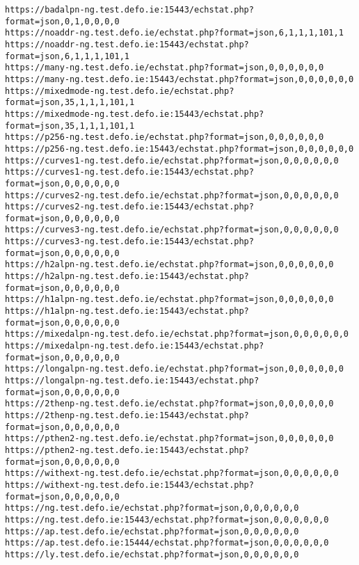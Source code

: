 \begin{verbatim}
https://badalpn-ng.test.defo.ie:15443/echstat.php?format=json,0,1,0,0,0,0
https://noaddr-ng.test.defo.ie/echstat.php?format=json,6,1,1,1,101,1
https://noaddr-ng.test.defo.ie:15443/echstat.php?format=json,6,1,1,1,101,1
https://many-ng.test.defo.ie/echstat.php?format=json,0,0,0,0,0,0
https://many-ng.test.defo.ie:15443/echstat.php?format=json,0,0,0,0,0,0
https://mixedmode-ng.test.defo.ie/echstat.php?format=json,35,1,1,1,101,1
https://mixedmode-ng.test.defo.ie:15443/echstat.php?format=json,35,1,1,1,101,1
https://p256-ng.test.defo.ie/echstat.php?format=json,0,0,0,0,0,0
https://p256-ng.test.defo.ie:15443/echstat.php?format=json,0,0,0,0,0,0
https://curves1-ng.test.defo.ie/echstat.php?format=json,0,0,0,0,0,0
https://curves1-ng.test.defo.ie:15443/echstat.php?format=json,0,0,0,0,0,0
https://curves2-ng.test.defo.ie/echstat.php?format=json,0,0,0,0,0,0
https://curves2-ng.test.defo.ie:15443/echstat.php?format=json,0,0,0,0,0,0
https://curves3-ng.test.defo.ie/echstat.php?format=json,0,0,0,0,0,0
https://curves3-ng.test.defo.ie:15443/echstat.php?format=json,0,0,0,0,0,0
https://h2alpn-ng.test.defo.ie/echstat.php?format=json,0,0,0,0,0,0
https://h2alpn-ng.test.defo.ie:15443/echstat.php?format=json,0,0,0,0,0,0
https://h1alpn-ng.test.defo.ie/echstat.php?format=json,0,0,0,0,0,0
https://h1alpn-ng.test.defo.ie:15443/echstat.php?format=json,0,0,0,0,0,0
https://mixedalpn-ng.test.defo.ie/echstat.php?format=json,0,0,0,0,0,0
https://mixedalpn-ng.test.defo.ie:15443/echstat.php?format=json,0,0,0,0,0,0
https://longalpn-ng.test.defo.ie/echstat.php?format=json,0,0,0,0,0,0
https://longalpn-ng.test.defo.ie:15443/echstat.php?format=json,0,0,0,0,0,0
https://2thenp-ng.test.defo.ie/echstat.php?format=json,0,0,0,0,0,0
https://2thenp-ng.test.defo.ie:15443/echstat.php?format=json,0,0,0,0,0,0
https://pthen2-ng.test.defo.ie/echstat.php?format=json,0,0,0,0,0,0
https://pthen2-ng.test.defo.ie:15443/echstat.php?format=json,0,0,0,0,0,0
https://withext-ng.test.defo.ie/echstat.php?format=json,0,0,0,0,0,0
https://withext-ng.test.defo.ie:15443/echstat.php?format=json,0,0,0,0,0,0
https://ng.test.defo.ie/echstat.php?format=json,0,0,0,0,0,0
https://ng.test.defo.ie:15443/echstat.php?format=json,0,0,0,0,0,0
https://ap.test.defo.ie/echstat.php?format=json,0,0,0,0,0,0
https://ap.test.defo.ie:15444/echstat.php?format=json,0,0,0,0,0,0
https://ly.test.defo.ie/echstat.php?format=json,0,0,0,0,0,0
\end{verbatim}
\normalsize
